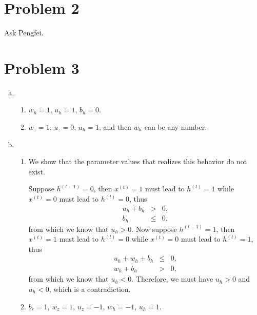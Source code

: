 \documentclass[11pt, oneside]{article}      %
\newcommand{\hasPageBreak}{}
\begin{document}
\hasPageBreak
\section*{Problem 2}
Ask Pengfei.



\hasPageBreak
\section*{Problem 3}
\begin{enumerate}   [(a)]
\item 
\begin{enumerate}   [i]
\item $w_h = 1$, $u_h = 1$, $b_h = 0$.
\item $w_z = 1$, $u_z = 0$, $u_h = 1$, and then $w_h$ can be any number.
\end{enumerate}







\item
\begin{enumerate}   [i]
\item 
We show that the parameter values that realizes this  behavior do not exist. 

Suppose $h^{(t-1)} = 0$, then $x^{(t)} = 1$ must lead to $h^{(t)} = 1$ while $x^{(t)} = 0$ must lead to $h^{(t)} = 0$, thus
\begin{eqnarray*}
u_h + b_h &>& 0,
\\
b_h &\leq& 0,
\end{eqnarray*}
from which we know that $u_h > 0$. Now suppose $h^{(t-1)} = 1$, then $x^{(t)} = 1$ must lead to $h^{(t)} = 0$ while $x^{(t)} = 0$ must lead to $h^{(t)} = 1$, thus
\begin{eqnarray*}
u_h + w_h + b_h &\leq& 0,
\\
w_h + b_h &>& 0,
\end{eqnarray*}
from which we know that $u_h < 0$. Therefore, we must have $u_h > 0$ and $u_h < 0$, which is a contradiction.



\item
$b_r = 1$, $w_z = 1$, $u_z = -1$, $w_h = -1$, $u_h = 1$.
\end{enumerate}






\end{enumerate}





\end{document}
